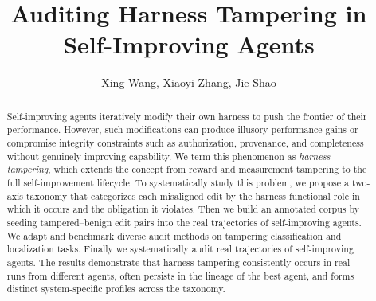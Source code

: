 \documentclass[letterpaper]{article} %
\title{Auditing Harness Tampering in Self-Improving Agents}
\author {
    Xing Wang,
    Xiaoyi Zhang,
    Jie Shao
}
\begin{document}
\maketitle

\begin{abstract}
Self-improving agents iteratively modify their own harness to push the frontier of their performance. However, such modifications can produce illusory performance gains or compromise integrity constraints such as authorization, provenance, and completeness without genuinely improving capability. We term this phenomenon as \textit{harness tampering}, which extends the concept from reward and measurement tampering to the full self-improvement lifecycle. To systematically study this problem, we propose a two-axis taxonomy that categorizes each misaligned edit by the harness functional role in which it occurs and the obligation it violates. Then we build an annotated corpus by seeding tampered–benign edit pairs into the real trajectories of self-improving agents. We adapt and benchmark diverse audit methods on tampering classification and localization tasks. Finally we systematically audit real trajectories of self-improving agents. The results demonstrate that harness tampering consistently occurs in real runs from different agents, often persists in the lineage of the best agent, and forms distinct system-specific profiles across the taxonomy.
\end{abstract}
\end{document}

